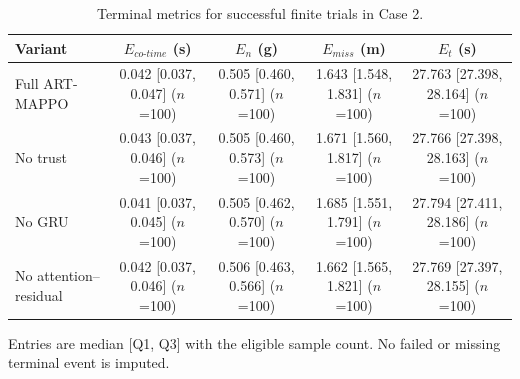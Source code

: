 \begin{table}[!t]
\centering
\small
\caption{Terminal metrics for successful finite trials in Case 2.}
\label{tab:ablation_terminal_case2}
\renewcommand{\arraystretch}{1.12}
\begin{tabular}{lcccc}
\toprule
Variant & $E_{co\text{-}time}$ (s) & $E_n$ (g) & $E_{miss}$ (m) & $E_t$ (s) \\
\midrule
Full ART-MAPPO & 0.042 [0.037, 0.047] ($n$=100) & 0.505 [0.460, 0.571] ($n$=100) & 1.643 [1.548, 1.831] ($n$=100) & 27.763 [27.398, 28.164] ($n$=100) \\
No trust & 0.043 [0.037, 0.046] ($n$=100) & 0.505 [0.460, 0.573] ($n$=100) & 1.671 [1.560, 1.817] ($n$=100) & 27.766 [27.398, 28.163] ($n$=100) \\
No GRU & 0.041 [0.037, 0.045] ($n$=100) & 0.505 [0.462, 0.570] ($n$=100) & 1.685 [1.551, 1.791] ($n$=100) & 27.794 [27.411, 28.186] ($n$=100) \\
No attention--residual & 0.042 [0.037, 0.046] ($n$=100) & 0.506 [0.463, 0.566] ($n$=100) & 1.662 [1.565, 1.821] ($n$=100) & 27.769 [27.397, 28.155] ($n$=100) \\
\bottomrule
\end{tabular}
\vspace{1mm}\parbox{0.98\linewidth}{\footnotesize Entries are median [Q1, Q3] with the eligible sample count. No failed or missing terminal event is imputed.}
\end{table}
